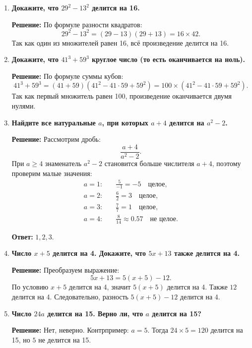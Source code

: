\documentclass[12pt, a4paper]{article}
\begin{document}
\begin{enumerate}[label=\arabic*., wide=0pt, leftmargin=*]
\item \textbf{Докажите, что $29^2 - 13^2$ делится на 16.}

\textbf{Решение:}
По формуле разности квадратов:
\[
29^2 - 13^2 = (29 - 13)(29 + 13) = 16 \times 42.
\]
Так как один из множителей равен 16, всё произведение делится на 16.

\item \textbf{Докажите, что $41^3 + 59^3$ круглое число (то есть оканчивается на ноль).}

\textbf{Решение:}
По формуле суммы кубов:
\[
41^3 + 59^3 = (41 + 59)(41^2 - 41 \cdot 59 + 59^2) = 100 \times (41^2 - 41 \cdot 59 + 59^2).
\]
Так как первый множитель равен 100, произведение оканчивается двумя нулями.

\item \textbf{Найдите все натуральные $a$, при которых $a + 4$ делится на $a^2 - 2$.}

\textbf{Решение:}
Рассмотрим дробь:
\[
\frac{a + 4}{a^2 - 2}.
\]
При $a \geq 4$ знаменатель $a^2 - 2$ становится больше числителя $a + 4$, поэтому проверим малые значения:
\begin{align*}
a = 1: &\quad \frac{5}{-1} = -5 \quad \text{целое}, \\
a = 2: &\quad \frac{6}{2} = 3 \quad \text{целое}, \\
a = 3: &\quad \frac{7}{7} = 1 \quad \text{целое}, \\
a = 4: &\quad \frac{8}{14} \approx 0.57 \quad \text{не целое}.
\end{align*}

\textbf{Ответ: } $1, 2, 3$.
 
\item \textbf{Число $x + 5$ делится на 4. Докажите, что $5x + 13$ также делится на 4.}

\textbf{Решение:}
Преобразуем выражение:
\[
5x + 13 = 5(x + 5) - 12.
\]
По условию $x + 5$ делится на 4, значит $5(x + 5)$ делится на 4. Также $12$ делится на 4. Следовательно, разность $5(x + 5) - 12$ делится на 4.

\item \textbf{Число $24a$ делится на 15. Верно ли, что $a$ делится на 15?}

\textbf{Решение:}
Нет, неверно. Контрпример: $a = 5$. Тогда $24 \times 5 = 120$ делится на 15, но $5$ не делится на 15.

\end{enumerate}
\end{document}
